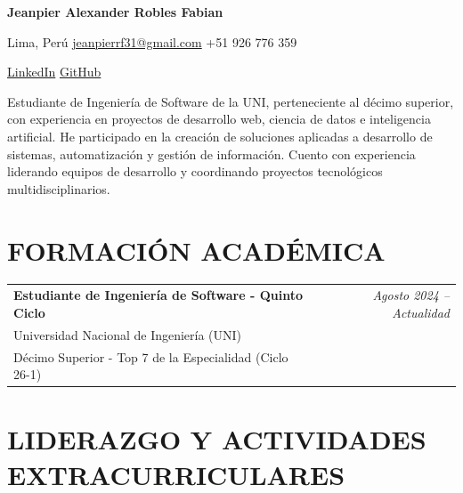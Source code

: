 \documentclass[a4paper,11pt]{article}
\makeatletter
\newcommand{\name}{Jeanpier Alexander Robles Fabian}
\newcommand{\phone}{926 776 359}
\newcommand{\emaila}{jeanpierrf31@gmail.com}
\newcommand{\linkedin}{https://www.linkedin.com/in/jeanpier-robles/}
\newcommand{\github}{https://github.com/jeannrf}
\newcommand{\location}{Lima, Perú}
\makeatother
\begin{document}
\selectfont

\begin{center}
    {\Huge\bfseries \name\par}



    \vspace{2mm}

    {\small
        \location
        \enspace\textbar\enspace
        \href{mailto:\emaila}{\emaila}
        \enspace\textbar\enspace
        +51 \phone
        \par
    }

    \vspace{1mm}

    {\small
        \href{\linkedin}{LinkedIn}
        \enspace\textbar\enspace
        \href{\github}{GitHub}
        \par
    }
\end{center}

\vspace{2mm}


\begin{addmargin}[\leftM]{\rightM}
\justifying
Estudiante de Ingeniería de Software de la UNI, perteneciente al décimo superior, con experiencia en proyectos de desarrollo web, ciencia de datos e inteligencia artificial.
He participado en la creación de soluciones aplicadas a desarrollo de sistemas, automatización y gestión de información.
Cuento con experiencia liderando equipos de desarrollo y coordinando proyectos tecnológicos multidisciplinarios.

\end{addmargin}

\section{\textbf{FORMACIÓN ACADÉMICA}}
\begin{tabularx}{\textwidth}{p{14cm} R}
  \textbf{Estudiante de Ingeniería de Software - Quinto Ciclo} & \textit{\footnotesize Agosto 2024 -- Actualidad} \\
  Universidad Nacional de Ingeniería (UNI) & \\
  \small Décimo Superior - Top 7 de la Especialidad (Ciclo 26-1) &
\end{tabularx}


\section{\textbf{LIDERAZGO Y ACTIVIDADES EXTRACURRICULARES}}
\end{document}

